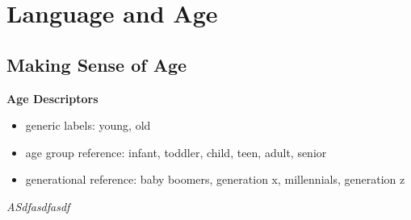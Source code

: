 \documentclass[../main.tex]{subfiles}
\begin{document}
\section{Language and Age}

\subsection{Making Sense of Age}
\textbf{Age Descriptors} \begin{itemize}
	\item generic labels: young, old
	\item age group reference: infant, toddler, child, teen, adult, senior
	\item generational reference: baby boomers, generation x, millennials, generation z
\end{itemize}

\textit{ASdfasdfasdf}
\end{document}
